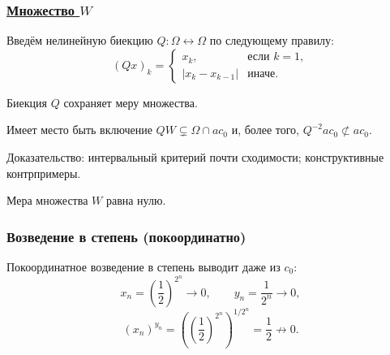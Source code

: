 \begin{frame}\frametitle{\underline{Множество $W$}}
	Введём нелинейную биекцию $Q:\Omega\leftrightarrow\Omega$ по следующему правилу:
	\begin{equation}
		(Qx)_k = \begin{cases}
			x_k, &\mbox{если~} k = 1,
			\\
			|x_k-x_{k-1}|&\mbox{иначе}.
		\end{cases}
	\end{equation}

	\begin{llemma}
		Биекция $Q$ сохраняет меру множества.
	\end{llemma}

	\begin{llemma}
		Имеет место быть включение $QW\subsetneq \Omega\cap ac_0$ и,
		более того,
		$Q^{-2} ac_0 \not \subset ac_0$.
	\end{llemma}

	Доказательство: интервальный критерий почти сходимости;
	конструктивные контрпримеры.


	\begin{ttheorem}
		Мера множества $W$ равна нулю.
	\end{ttheorem}


\end{frame}





\begin{frame}\frametitle{Возведение в степень (покоординатно)}
	Покоординатное возведение в степень выводит даже из $c_0$:
	\vfill
	\begin{equation}
		x_n = \left(\frac12\right)^{2^n} \to 0, \qquad
		y_n = \frac1{2^n} \to 0,
	\end{equation}
	\vfill
	\begin{equation}
		(x_n)^{y_n} = \left(\left(\frac12\right)^{2^n}\right)^{1/2^n}  = \frac12 \not \to 0
		.
	\end{equation}


\end{frame}



